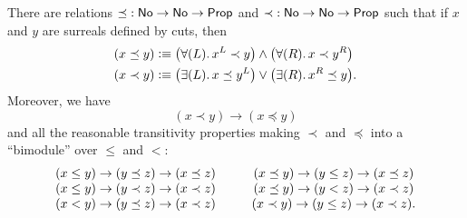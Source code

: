 \begin{thm}\label{defn:No-codes}
  There are relations $\mathord\preceq:\mathsf{No}\to\mathsf{No}\to\mathsf{Prop}$ and $\mathord\prec:\mathsf{No}\to\mathsf{No}\to\mathsf{Prop}$ such that if $x$ and $y$ are surreals defined by cuts, then
  \begin{align*}
    (x\preceq y) &\defeq
    \big(\fall{L} x^L\prec y\big) \land \big(\fall{R} x\prec y^R\big)\\
    (x\prec y) &\defeq
    \big(\exis{L} x\preceq y^L\big) \lor \big(\exis{R} x^R \preceq y\big).
  \end{align*}
  Moreover, we have
  \begin{equation}\label{eq:NO-codes-unstrict}
    (x\prec y) \to (x\preceq y)
  \end{equation}
  and all the reasonable transitivity properties making $\prec$ and $\preceq$ into a ``bimodule'' over $\le$ and $<$:
  \begin{equation}\label{eq:NO-codes-transitivity}
    \begin{array}{c@{\hspace{1cm}}c}
      (x \le y) \to (y\preceq z) \to (x\preceq z) &
      (x \preceq y) \to (y\le z) \to (x\preceq z) \\
      (x \le y) \to (y\prec z) \to (x\prec z) &
      (x \preceq y) \to (y< z) \to (x\prec z) \\
      (x < y) \to (y\preceq z) \to (x\prec z) &
      (x \prec y) \to (y\le z) \to (x\prec z).
  \end{array}
  \end{equation}
\end{thm}

